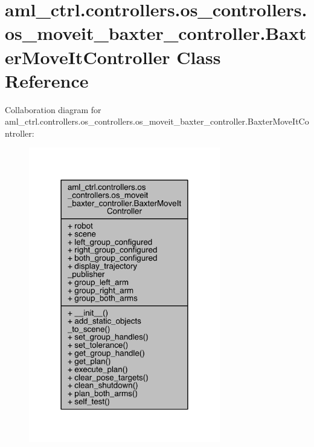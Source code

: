 \hypertarget{classaml__ctrl_1_1controllers_1_1os__controllers_1_1os__moveit__baxter__controller_1_1_baxter_move_it_controller}{}\section{aml\+\_\+ctrl.\+controllers.\+os\+\_\+controllers.\+os\+\_\+moveit\+\_\+baxter\+\_\+controller.\+Baxter\+Move\+It\+Controller Class Reference}
\label{classaml__ctrl_1_1controllers_1_1os__controllers_1_1os__moveit__baxter__controller_1_1_baxter_move_it_controller}


Collaboration diagram for aml\+\_\+ctrl.\+controllers.\+os\+\_\+controllers.\+os\+\_\+moveit\+\_\+baxter\+\_\+controller.\+Baxter\+Move\+It\+Controller\+:\nopagebreak
\begin{figure}[H]
\begin{center}
\leavevmode
\includegraphics[width=237pt]{classaml__ctrl_1_1controllers_1_1os__controllers_1_1os__moveit__baxter__controller_1_1_baxter_move_it_controller__coll__graph}
\end{center}
\end{figure}
